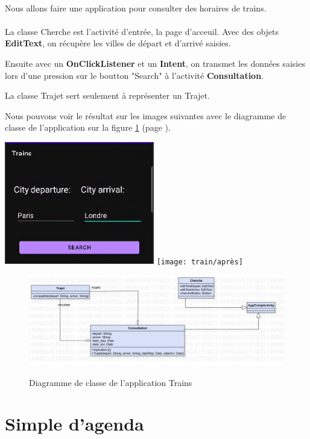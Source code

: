 \documentclass[a4paper]{article}
\begin{document}
\begin{multicols}{2}
    \paragraph{}
      Nous allons faire une application pour consulter des horaires de trains.
    \paragraph{}
      La classe Cherche est l'activité d'entrée, la page d'acceuil. Avec des objets \textbf{EditText}, on récupère les villes de départ et d'arrivé saisies.

      Ensuite avec un \textbf{OnClickListener} et un \textbf{Intent}, on transmet les données saisies lors d'une pression sur le boutton "Search" à l'activité \textbf{Consultation}.

      La classe Trajet sert seulement à représenter un Trajet.

      Nous pouvons voir le résultat sur les images suivantes avec le diagramme de classe de l'application sur la figure \ref{fig:trainClass} (page \pageref{fig:trainClass}).
      
      \noindent\includegraphics[width=0.49\textwidth]{train/avant}
      \texttt{[image: train/après]}
    \begin{figure}
      \centering
      \caption{Diagramme de classe de l'application Trains}
      \includegraphics[width=\textwidth]{jpg/Model1!Train_1}
      \label{fig:trainClass}
    \end{figure}
  \section{Simple d’agenda}

\end{multicols}
\end{document}
